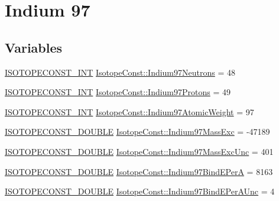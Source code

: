 \hypertarget{group___isotope_const-_indium-_in97}{}\section{Indium 97}
\label{group___isotope_const-_indium-_in97}
\subsection*{Variables}
\begin{DoxyCompactItemize}
\item 
\mbox{\hyperlink{group___isotope_const-_macros_ga5f18360b3e99483a35c32d789e62621c}{I\+S\+O\+T\+O\+P\+E\+C\+O\+N\+S\+T\+\_\+\+I\+NT}} \mbox{\hyperlink{group___isotope_const-_indium-_in97_gac480c77dc693f182d267efdc70e93f94}{Isotope\+Const\+::\+Indium97\+Neutrons}} = 48
\item 
\mbox{\hyperlink{group___isotope_const-_macros_ga5f18360b3e99483a35c32d789e62621c}{I\+S\+O\+T\+O\+P\+E\+C\+O\+N\+S\+T\+\_\+\+I\+NT}} \mbox{\hyperlink{group___isotope_const-_indium-_in97_ga52acea406d28a909681b6cf83fde86fe}{Isotope\+Const\+::\+Indium97\+Protons}} = 49
\item 
\mbox{\hyperlink{group___isotope_const-_macros_ga5f18360b3e99483a35c32d789e62621c}{I\+S\+O\+T\+O\+P\+E\+C\+O\+N\+S\+T\+\_\+\+I\+NT}} \mbox{\hyperlink{group___isotope_const-_indium-_in97_gaf8a1f3bafd9a23a47f6ab4950b45c680}{Isotope\+Const\+::\+Indium97\+Atomic\+Weight}} = 97
\item 
\mbox{\hyperlink{group___isotope_const-_macros_ga8f45a7272ce02c0b4c65c44636ed719a}{I\+S\+O\+T\+O\+P\+E\+C\+O\+N\+S\+T\+\_\+\+D\+O\+U\+B\+LE}} \mbox{\hyperlink{group___isotope_const-_indium-_in97_ga96007021bc8c047ff09edb6160d500b4}{Isotope\+Const\+::\+Indium97\+Mass\+Exc}} = -\/47189
\item 
\mbox{\hyperlink{group___isotope_const-_macros_ga8f45a7272ce02c0b4c65c44636ed719a}{I\+S\+O\+T\+O\+P\+E\+C\+O\+N\+S\+T\+\_\+\+D\+O\+U\+B\+LE}} \mbox{\hyperlink{group___isotope_const-_indium-_in97_ga5f1e102e203538cdaaa19d850c114445}{Isotope\+Const\+::\+Indium97\+Mass\+Exc\+Unc}} = 401
\item 
\mbox{\hyperlink{group___isotope_const-_macros_ga8f45a7272ce02c0b4c65c44636ed719a}{I\+S\+O\+T\+O\+P\+E\+C\+O\+N\+S\+T\+\_\+\+D\+O\+U\+B\+LE}} \mbox{\hyperlink{group___isotope_const-_indium-_in97_ga529d1edf4b64b6de683858d881ec7214}{Isotope\+Const\+::\+Indium97\+Bind\+E\+PerA}} = 8163
\item 
\mbox{\hyperlink{group___isotope_const-_macros_ga8f45a7272ce02c0b4c65c44636ed719a}{I\+S\+O\+T\+O\+P\+E\+C\+O\+N\+S\+T\+\_\+\+D\+O\+U\+B\+LE}} \mbox{\hyperlink{group___isotope_const-_indium-_in97_gab78c7b47a3992c1679284d366eb6a995}{Isotope\+Const\+::\+Indium97\+Bind\+E\+Per\+A\+Unc}} = 4

\end{DoxyCompactItemize}
